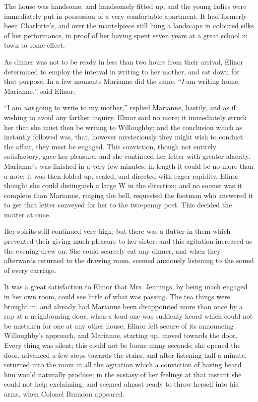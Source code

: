 The house was handsome, and handsomely fitted up, and the young ladies were immediately put in possession of a very comfortable apartment. It had formerly been Charlotte's, and over the mantelpiece still hung a landscape in coloured silks of her performance, in proof of her having spent seven years at a great school in town to some effect.

As dinner was not to be ready in less than two hours from their arrival, Elinor determined to employ the interval in writing to her mother, and sat down for that purpose. In a few moments Marianne did the same. “{\em I} am writing home, Marianne,” said Elinor; 

“I am {\em not} going to write to my mother,” replied Marianne, hastily, and as if wishing to avoid any farther inquiry. Elinor said no more; it immediately struck her that she must then be writing to Willoughby; and the conclusion which as instantly followed was, that, however mysteriously they might wish to conduct the affair, they must be engaged. This conviction, though not entirely satisfactory, gave her pleasure, and she continued her letter with greater alacrity. Marianne's was finished in a very few minutes; in length it could be no more than a note; it was then folded up, sealed, and directed with eager rapidity. Elinor thought she could distinguish a large W in the direction; and no sooner was it complete than Marianne, ringing the bell, requested the footman who answered it to get that letter conveyed for her to the two-penny post. This decided the matter at once.

Her spirits still continued very high; but there was a flutter in them which prevented their giving much pleasure to her sister, and this agitation increased as the evening drew on. She could scarcely eat any dinner, and when they afterwards returned to the drawing room, seemed anxiously listening to the sound of every carriage.

It was a great satisfaction to Elinor that Mrs. Jennings, by being much engaged in her own room, could see little of what was passing. The tea things were brought in, and already had Marianne been disappointed more than once by a rap at a neighbouring door, when a loud one was suddenly heard which could not be mistaken for one at any other house, Elinor felt secure of its announcing Willoughby's approach, and Marianne, starting up, moved towards the door. Every thing was silent; this could not be borne many seconds; she opened the door, advanced a few steps towards the stairs, and after listening half a minute, returned into the room in all the agitation which a conviction of having heard him would naturally produce; in the ecstasy of her feelings at that instant she could not help exclaiming,  and seemed almost ready to throw herself into his arms, when Colonel Brandon appeared.

